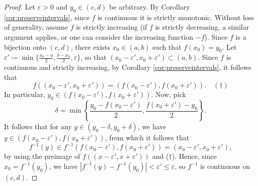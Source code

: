 \documentclass[../analysis1.tex]{subfiles}
\begin{document}
\begin{proof}
    Let $\varepsilon>0$ and $y_0\in (c,d)$ be arbitrary. By Corollary \ref{cor:preserveintervals}, since $f$ is continuous it is strictly monotonic. Without loss of generality, assume $f$ is strictly increasing (if $f$ is strictly decreasing, a similar argument applies, or one can consider the increasing function $-f$). Since $f$ is a bijection onto $(c,d)$, there exists $x_0\in (a,b)$ such that $f(x_0)=y_0$. Let $\varepsilon' \coloneqq \min\{\frac{x_0-a}{2},\frac{b-x_0}{2},\varepsilon \}$, so that $(x_0-\varepsilon',x_0+\varepsilon')\subset (a,b)$.
    Since $f$ is continuous and strictly increasing, by Corollary \ref{cor:preserveintervals}, it follows that \[f((x_0-\varepsilon',x_0+\varepsilon'))=(f(x_0-\varepsilon'),f(x_0+\varepsilon')).\quad (\dagger)\]
    In particular, $y_0\in(f(x_0-\varepsilon'), f(x_0+\varepsilon'))$. Now, pick \[\delta=\min\left\{\frac{y_0-f(x_0-\varepsilon')}{2},\frac{f(x_0+\varepsilon')-y_0}{2}\right\}.\] It follows that for any $y\in (y_0-\delta,y_0+\delta)$, we have $y\in (f(x_0-\varepsilon'),f(x_0+\varepsilon'))$, from which it follows that \[f^{-1}(y)\in f^{-1}(f(x_0-\varepsilon'),f(x_0+\varepsilon'))=(x_0-\varepsilon',x_0+\varepsilon'),\]
    by using the preimage of $f((x-\varepsilon',x+\varepsilon'))$ and ($\dagger$). Hence, since $x_0=f^{-1}(y_0)$, we have $|f^{-1}(y)-f^{-1}(y_0)|<\varepsilon'\le \varepsilon$, so $f^{-1}$ is continuous on $(c,d)$.\qedhere
\end{proof}
\end{document}
